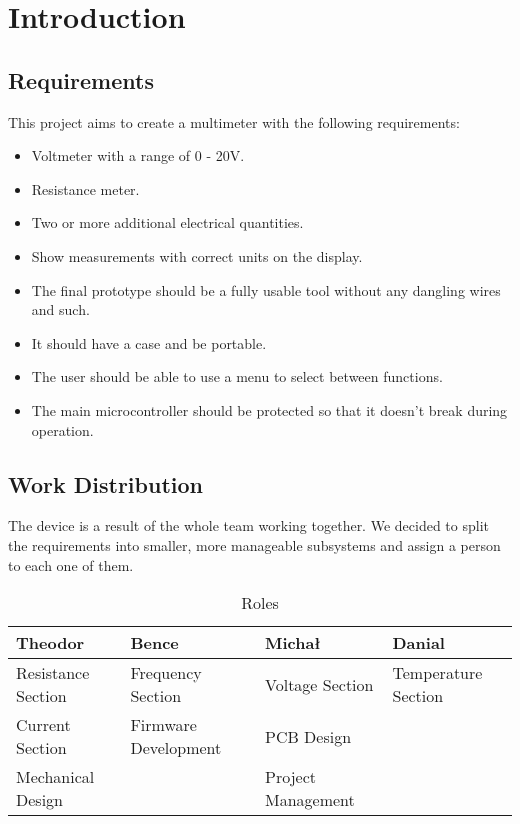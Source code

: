 \section{Introduction}
\label{sec:introduction}

\subsection{Requirements}
This project aims to create a multimeter with the following requirements: 
\begin{itemize}
    \item Voltmeter with a range of 0 - 20V.
    \item Resistance meter.
    \item Two or more additional electrical quantities.
    \item Show measurements with correct units on the display.
    \item The final prototype should be a fully usable tool without any dangling wires and such.
    \item It should have a case and be portable.
    \item The user should be able to use a menu to select between functions.
    \item The main microcontroller should be protected so that it doesn't break during operation.
\end{itemize}

\subsection{Work Distribution}
The device is a result of the whole team working together. We decided to split the requirements into smaller, more manageable subsystems and assign a person to each one of them.
\renewcommand{\arraystretch}{1.3}
\begin{table}[h]
    \centering
    \begin{tabular}{|l|l|l|l|}
        \hline
        \textbf{Theodor} & \textbf{Bence} & \textbf{Michał} & \textbf{Danial} \\
        \hline
        Resistance Section & Frequency Section & Voltage Section & Temperature Section\\
        \hline
        Current Section & Firmware Development & PCB Design & \\
        \hline
        Mechanical Design & & Project Management & \\
        \hline
    \end{tabular}
    \caption{Roles}
    \label{tab:roles}
\end{table}

